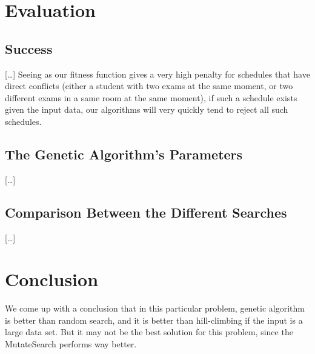 \documentclass[letterpaper]{article}
\begin{document}
\section{Evaluation}
  \subsection{Success}
    [\ldots]
    Seeing as our fitness function gives a very high penalty for schedules that have direct
    conflicts (either a student with two exams at the same moment, or two different exams
    in a same room at the same moment), if such a schedule exists given the input data, our
    algorithms will very quickly tend to reject all such schedules.
  \subsection{The Genetic Algorithm's Parameters}
    [\ldots]
  \subsection{Comparison Between the Different Searches}
    [\ldots]
  
\section{Conclusion}
  We come up with a conclusion that in this particular problem, genetic algorithm
  is better than random search, and it is better than hill-climbing if the input 
  is a large data set. But it may not be the best solution for this problem, since
  the MutateSearch performs way better.
  


\end{document}
